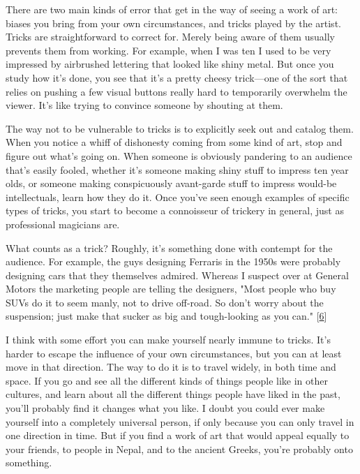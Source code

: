 There
                  are two main kinds of error that get in the way of seeing a
                  work of art: biases you bring from your own circumstances, and
                  tricks played by the artist. Tricks are straightforward to
                  correct for. Merely being aware of them usually prevents them
                  from working. For example, when I was ten I used to be very
                  impressed by airbrushed lettering that looked like shiny
                  metal. But once you study how it's done, you see that it's a
                  pretty cheesy trick---one of the sort that relies on
                  pushing a few visual buttons really hard to temporarily
                  overwhelm the viewer. It's like trying to convince someone by
                  shouting at them.

The way not to be vulnerable to
                  tricks is to explicitly seek out and catalog them. When you
                  notice a whiff of dishonesty coming from some kind of art,
                  stop and figure out what's going on. When someone is obviously
                  pandering to an audience that's easily fooled, whether it's
                  someone making shiny stuff to impress ten year olds, or
                  someone making conspicuously avant-garde stuff to impress
                  would-be intellectuals, learn how they do it. Once you've seen
                  enough examples of specific types of tricks, you start to
                  become a connoisseur of trickery in general, just as
                  professional magicians are.

What counts as a trick?
                  Roughly, it's something done with contempt for the audience.
                  For example, the guys designing Ferraris in the 1950s were
                  probably designing cars that they themselves admired. Whereas
                  I suspect over at General Motors the marketing people are
                  telling the designers, "Most people who buy SUVs do it to seem
                  manly, not to drive off-road. So don't worry about the
                  suspension; just make that sucker as big and tough-looking as
                  you can."
                  [\href{\#f6n}{6}]

I think with some effort you can make yourself
                  nearly immune to tricks. It's harder to escape the influence
                  of your own circumstances, but you can at least move in that
                  direction. The way to do it is to travel widely, in both time
                  and space. If you go and see all the different kinds of things
                  people like in other cultures, and learn about all the
                  different things people have liked in the past, you'll
                  probably find it changes what you like. I doubt you could ever
                  make yourself into a completely universal person, if only
                  because you can only travel in one direction in time. But if
                  you find a work of art that would appeal equally to your
                  friends, to people in Nepal, and to the ancient Greeks, you're
                  probably onto something.

